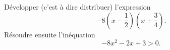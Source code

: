 
\begin{exercice}\label{exoPremiere-0061}

    Développer (c'est à dire distribuer) l'expression
    \begin{equation}
        -8(x-\frac{ 1 }{2})(x+\frac{ 3 }{ 4 }).
    \end{equation}
    Résoudre ensuite l'inéquation
    \begin{equation}
        -8x^2-2x+3>0.
    \end{equation}

\end{exercice}
